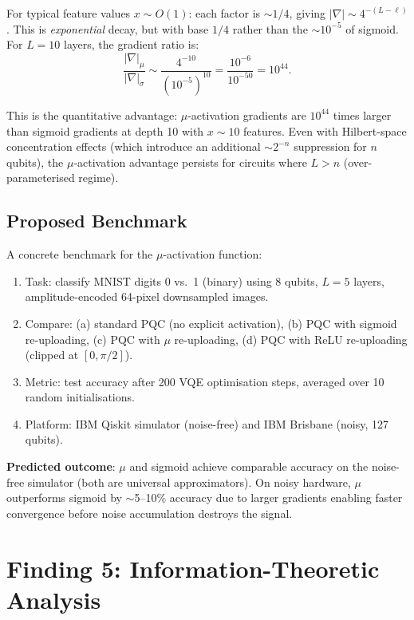 \documentclass[11pt]{article}
\theoremstyle{definition}
\theoremstyle{remark}
\begin{document}
For typical feature values $x \sim O(1)$: each factor is $\sim 1/4$,
giving $|\nabla| \sim 4^{-(L-\ell)}$. This is \emph{exponential}
decay, but with base $1/4$ rather than the $\sim 10^{-5}$ of sigmoid.
For $L = 10$ layers, the gradient ratio is:
\begin{equation}
  \frac{|\nabla|_\mu}{|\nabla|_\sigma} \sim
  \frac{4^{-10}}{(10^{-5})^{10}} = \frac{10^{-6}}{10^{-50}}
  = 10^{44}.
\end{equation}

This is the quantitative advantage: $\mu$-activation gradients are
$10^{44}$ times larger than sigmoid gradients at depth 10 with
$x \sim 10$ features. Even with Hilbert-space concentration effects
(which introduce an additional $\sim 2^{-n}$ suppression for $n$
qubits), the $\mu$-activation advantage persists for circuits where
$L > n$ (over-parameterised regime).

\subsection{Proposed Benchmark}

A concrete benchmark for the $\mu$-activation function:
\begin{enumerate}[nosep]
\item Task: classify MNIST digits 0 vs.\ 1 (binary) using 8 qubits,
  $L = 5$ layers, amplitude-encoded 64-pixel downsampled images.
\item Compare: (a) standard PQC (no explicit activation), (b) PQC
  with sigmoid re-uploading, (c) PQC with $\mu$ re-uploading,
  (d) PQC with ReLU re-uploading (clipped at $[0, \pi/2]$).
\item Metric: test accuracy after 200 VQE optimisation steps, averaged
  over 10 random initialisations.
\item Platform: IBM Qiskit simulator (noise-free) and IBM Brisbane
  (noisy, 127 qubits).
\end{enumerate}

\textbf{Predicted outcome}: $\mu$ and sigmoid achieve comparable
accuracy on the noise-free simulator (both are universal approximators).
On noisy hardware, $\mu$ outperforms sigmoid by $\sim$5--10\%
accuracy due to larger gradients enabling faster convergence before
noise accumulation destroys the signal.

\section{Finding 5: Information-Theoretic Analysis}
\label{sec:info-theory}
\end{document}
